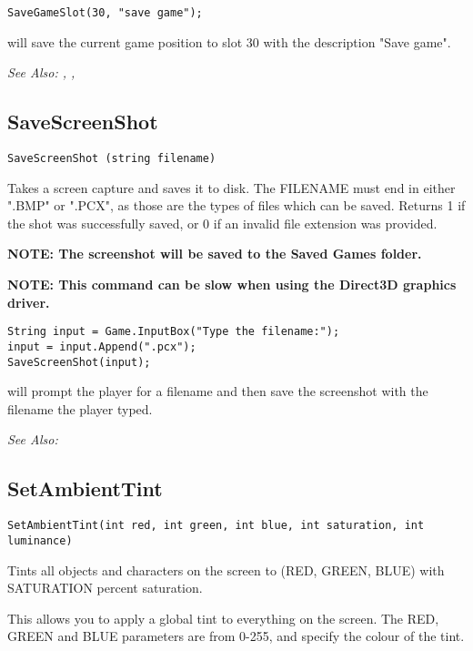 \begin{verbatim}
SaveGameSlot(30, "save game");
\end{verbatim}
will save the current game position to slot 30 with the description "Save game".

\it{See Also:} , , 


\subsection{SaveScreenShot}\label{SaveScreenShot}%

\begin{verbatim}
SaveScreenShot (string filename)
\end{verbatim}
Takes a screen capture and saves it to disk. The FILENAME must end in
either ".BMP" or ".PCX", as those are the types of files which can be saved.
Returns 1 if the shot was successfully saved, or 0 if an invalid file
extension was provided.

\bf{NOTE:} The screenshot will be saved to the Saved Games folder.

\bf{NOTE:} This command can be slow when using the Direct3D graphics driver.

\begin{verbatim}
String input = Game.InputBox("Type the filename:");
input = input.Append(".pcx");
SaveScreenShot(input);
\end{verbatim}
will prompt the player for a filename and then save the screenshot with the filename the player typed.

\it{See Also:} 


\subsection{SetAmbientTint}\label{SetAmbientTint}%

\begin{verbatim}
SetAmbientTint(int red, int green, int blue, int saturation, int luminance)
\end{verbatim}

Tints all objects and characters on the screen to (RED, GREEN, BLUE) with SATURATION percent
saturation.

This allows you to apply a global tint to everything on the screen. The RED, GREEN and BLUE
parameters are from 0-255, and specify the colour of the tint.

